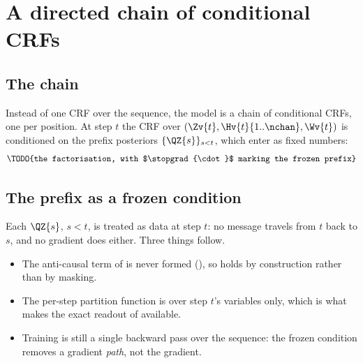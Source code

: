 \section{A directed chain of conditional CRFs}
\label{sec:construction}


\subsection{The chain}

Instead of one CRF over the sequence, the model is a chain of conditional CRFs, one per
position. At step $t$ the CRF over $(\Zv{t}, \Hv{t}{1..\nchan}, \Wv{t})$ is conditioned on the
prefix posteriors $\{\QZ{s}\}_{s < t}$, which enter as fixed numbers:
%
\begin{equation}
\label{eq:chain}
  \TODO{the factorisation, with $\stopgrad{\cdot}$ marking the frozen prefix}
\end{equation}

\subsection{The prefix as a frozen condition}
\label{sec:frozen-prefix}

Each $\QZ{s}$, $s<t$, is treated as data at step $t$: no message travels from $t$ back to $s$,
and no gradient does either. Three things follow.

\begin{itemize}
  \item The anti-causal term of  is never formed
        (), so  holds by construction rather than by
        masking.
  \item The per-step partition function is over step $t$'s variables only, which is what makes
        the exact readout of  available.
  \item Training is still a single backward pass over the sequence: the frozen condition
        removes a gradient \emph{path}, not the gradient.
\end{itemize}


